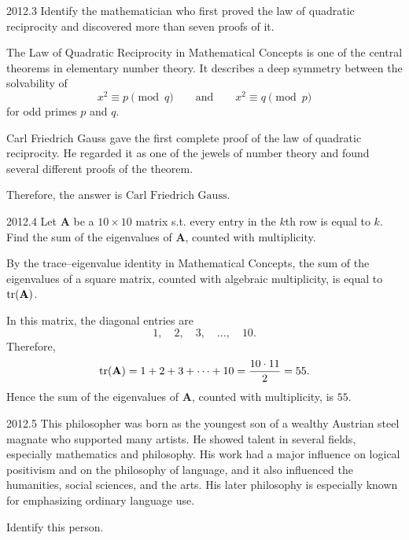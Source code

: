     \begin{pastproblem}{2012.3}
        Identify the mathematician who first proved the law of quadratic reciprocity and discovered
        more than seven proofs of it.
    \end{pastproblem}

    \begin{solution}
        The Law of Quadratic Reciprocity in Mathematical Concepts is one of the central theorems
        in elementary number theory.
        It describes a deep symmetry between the solvability of
        \[
            x^2\equiv p \pmod q
            \qquad\text{and}\qquad
            x^2\equiv q \pmod p
        \]
        for odd primes $p$ and $q$.

        Carl Friedrich Gauss gave the first complete proof of the law of quadratic reciprocity. He
        regarded it as one of the jewels of number theory and found several different proofs of the
        theorem.

        Therefore, the answer is $\boxed{\text{Carl Friedrich Gauss}}$.
    \end{solution}

    \begin{pastproblem}{2012.4}
        Let $\mathbf{A}$ be a $10\times 10$ matrix s.t. every entry in the $k$th row is equal
        to $k$. Find the sum of the eigenvalues of $\mathbf{A}$, counted with multiplicity.
    \end{pastproblem}

    \begin{solution}
        By the trace--eigenvalue identity in Mathematical Concepts, the sum of the eigenvalues of a square matrix, counted with algebraic multiplicity, is equal
        to $\operatorname{tr}(\mathbf{A})$.

        In this matrix, the diagonal entries are
        \[
            1,\quad 2,\quad 3,\quad \dots,\quad 10.
        \]
        Therefore,
        \[
            \operatorname{tr}(\mathbf{A})
            =
            1+2+3+\cdots+10
            =
            \frac{10\cdot 11}{2}
            =
            55.
        \]
        Hence the sum of the eigenvalues of $\mathbf{A}$, counted with multiplicity, is
        $\boxed{55}$.
    \end{solution}

    \begin{pastproblem}{2012.5}
        This philosopher was born as the youngest son of a wealthy Austrian steel magnate who
        supported many artists. He showed talent in several fields, especially mathematics and
        philosophy. His work had a major influence on logical positivism and on the philosophy of
        language, and it also influenced the humanities, social sciences, and the arts. His later
        philosophy is especially known for emphasizing ordinary language use.

        Identify this person.
    \end{pastproblem}

